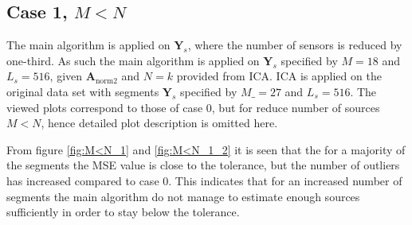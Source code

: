 \subsection{Case 1, $M < N$}
The main algorithm is applied on $\mathbf{Y}_s$, where the number of sensors is reduced by one-third. 
As such the main algorithm is applied on $\mathbf{Y}_s$ specified by $M = 18$ and $L_s = 516$, given $\mathbf{A}_{\text{norm2}}$ and $N = k$ provided from ICA. 
ICA is applied on the original data set with segments $\mathbf{Y}_s$ specified by $M\_ = 27$ and $L_s = 516$.  
The viewed plots correspond to those of case 0, but for reduce number of sources $M < N$, hence detailed plot description is omitted here.   

From figure \ref{fig:M<N_1} and \ref{fig:M<N_1_2} it is seen that the for a majority of the segments the MSE value is close to the tolerance, but the number of outliers has increased compared to case 0.
This indicates that for an increased number of segments the main algorithm do not manage to estimate enough sources sufficiently in order to stay below the tolerance.   
